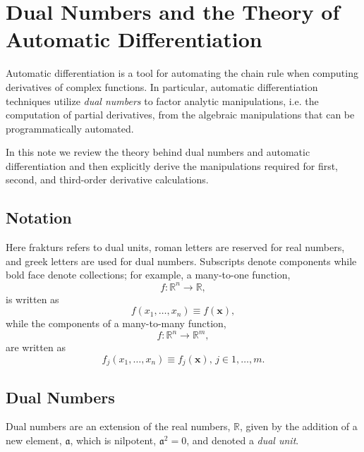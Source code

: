 \chapter{Dual Numbers and the Theory of Automatic Differentiation}

Automatic differentiation is a tool for automating the chain rule when computing
derivatives of complex functions.  In particular, automatic differentiation techniques
utilize \textit{dual numbers} to factor analytic manipulations, i.e. the computation of
partial derivatives, from the algebraic manipulations that can be programmatically
automated.

In this note we review the theory behind dual numbers and automatic differentiation
and then explicitly derive the manipulations required for first, second, and third-order
derivative calculations.

\section{Notation}

Here frakturs refers to dual units,  roman letters are reserved for real numbers, and greek 
letters are used for dual numbers.  Subscripts denote components while bold face denote 
collections; for example, a many-to-one function,
%
\begin{equation*}
f : \mathbb{R}^{n} \rightarrow \mathbb{R},
\end{equation*}
%
is written as
%
\begin{equation*}
f \! \left( x_{1}, \ldots, x_{n} \right) \equiv f \! \left( \mathbf{x} \right),
\end{equation*} 
%
while the components of a many-to-many function,
%
\begin{equation*}
f : \mathbb{R}^{n} \rightarrow \mathbb{R}^{m},
\end{equation*}
%
are written as
%
\begin{equation*}
f_{j} \! \left( x_{1}, \ldots, x_{n} \right) \equiv f_{j} \! \left( \mathbf{x} \right), \, j \in 1, \ldots, m.
\end{equation*} 

\section{Dual Numbers}

Dual numbers are an extension of the real numbers, $\mathbb{R}$, given by the
addition of a new element, $\mathfrak{a}$, which is nilpotent, $\mathfrak{a}^{2} = 0$,
and denoted a \textit{dual unit}.

